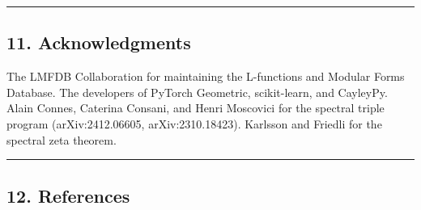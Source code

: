 \documentclass[
]{article}
\begin{document}
\begin{center}\rule{0.5\linewidth}{0.5pt}\end{center}

\hypertarget{acknowledgments}{%
\subsection{11. Acknowledgments}\label{acknowledgments}}

The LMFDB Collaboration for maintaining the L-functions and Modular
Forms Database. The developers of PyTorch Geometric, scikit-learn, and
CayleyPy. Alain Connes, Caterina Consani, and Henri Moscovici for the
spectral triple program (arXiv:2412.06605, arXiv:2310.18423). Karlsson
and Friedli for the spectral zeta theorem.

\begin{center}\rule{0.5\linewidth}{0.5pt}\end{center}

\hypertarget{references}{%
\subsection{12. References}\label{references}}
\end{document}
